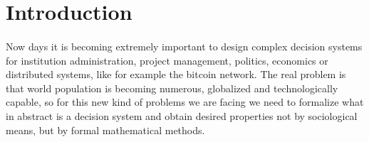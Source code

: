 
\section{Introduction}\label{introduction}

\paragraph{} Now days it is becoming extremely important to design complex decision systems for institution administration, project management, politics, economics or distributed systems, like for example the bitcoin network. The real problem is that world population is becoming numerous, globalized and technologically capable, so for this new kind of problems we are facing we need to formalize what in abstract is a decision system and obtain desired properties not by sociological means, but by formal mathematical methods.
